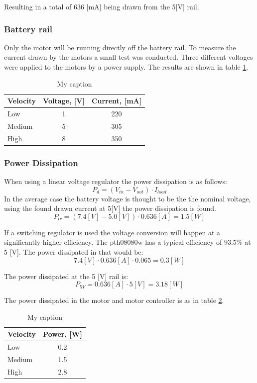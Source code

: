 Resulting in a total of $636$ [mA] being drawn from the 5[V] rail.

\subsubsection{Battery rail} %

Only the motor will be running directly off the battery rail.
To measure the current drawn by the motors a small test was conducted.
Three different voltages were applied to the motors by a power supply. 
The results are shown in table \ref{tab:motor_power}.

\begin{table}[h]
\centering
\caption{My caption}
\label{tab:motor_power}
\begin{tabular}{|l|c|c|}
\hline
\textbf{Velocity} & Voltage, [V]   & Current, [mA]      \\ \hline
Low     & 1  & 220  \\ \hline
Medium & 5  & 305  \\ \hline
High         & 8  & 350  \\ \hline
\end{tabular}
\end{table}


\subsubsection{Power Dissipation} %
\label{sec:power_dissipation}
When using a linear voltage regulator the power dissipation is as follows:
$$P_d = (V_{in} - V_{out}) \cdot I_{load}$$
In the average case the battery voltage is thought to be the the nominal voltage, using the found drawn current at 5[V] the power dissipation is found.
$$P_{lr} = (7.4 [V] - 5.0 [V]) \cdot 0.636 [A] = 1.5 [W]$$

If a switching regulator is used the voltage conversion will happen at a significantly higher efficiency.
The pth08080w has a typical efficiency of $93.5\%$ at 5 [V].
The power dissipated in that would be:
$$7.4 [V] \cdot 0.636 [A] \cdot 0.065 = 0.3 [W]$$


The power dissipated at the 5 [V] rail is:
$$P_{5V} = 0.636 [A] \cdot 5 [V] = 3.18 [W]$$

The power dissipated in the motor and motor controller is as in table \ref{tab:power_motor}.

\begin{table}[h]
\centering
\caption{My caption}
\label{tab:power_motor}
\begin{tabular}{|l|c|}
\hline
\textbf{Velocity} & Power, [W]     \\ \hline
Low       & 0.2 \\ \hline
Medium & 1.5 \\ \hline
High         & 2.8 \\ \hline
\end{tabular}
\end{table}

